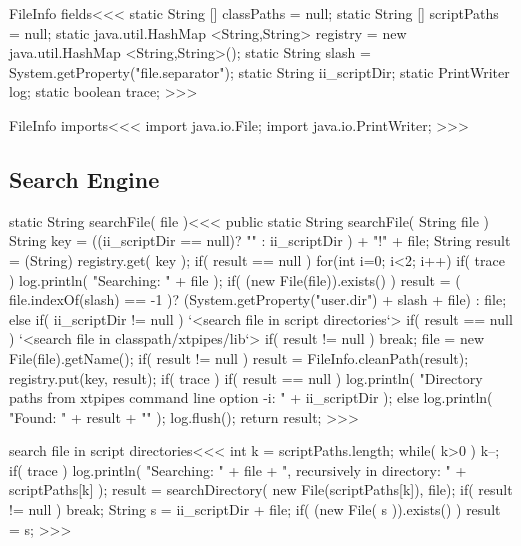 \documentclass{article}
\begin{document}
\<FileInfo fields\><<<
static String [] classPaths = null;
static String [] scriptPaths = null;
static java.util.HashMap <String,String> registry =
                                  new java.util.HashMap <String,String>();
static String slash = System.getProperty("file.separator");
static String ii_scriptDir;
static PrintWriter log;
static boolean trace;
>>>


\<FileInfo imports\><<<
import java.io.File;
import java.io.PrintWriter;
>>>

\subsection{Search Engine}




\<static String searchFile( file )\><<<
public static String searchFile( String file ){
   String key = ((ii_scriptDir == null)? "" : ii_scriptDir )
                + "!" + file;
   String result = (String) registry.get( key );
   if( result == null ){
      for(int i=0; i<2; i++){
         if( trace ){
            log.println( "Searching: " + file );
         }
         if( (new File(file)).exists() ){
            result = ( file.indexOf(slash) == -1 )?
                         (System.getProperty("user.dir") + slash + file)
                        :
                         file;
         }
         else {
            if( ii_scriptDir != null ){
               `<search file in script directories`>
            }
            if( result == null ){
               `<search file in classpath/xtpipes/lib`>
         }  }
         if( result != null ){ break; }
         file =  new File(file).getName();
      }
      if( result != null ){
        result = FileInfo.cleanPath(result);
        registry.put(key, result);
      }
   }
   if( trace ){
      if( result == null ){
         log.println(
            "Directory paths from xtpipes command line option -i: "
                                            + ii_scriptDir );
      } else { log.println( "Found: " + result + "\n" ); }
      log.flush();
   }
   return result;
}
>>>



\<search file in script directories\><<<
int k = scriptPaths.length;
while( k>0 ){
  k--;
  if( trace ){
    log.println( "Searching: " + file
                   + ", recursively in directory: " + scriptPaths[k] );
  }
  result = searchDirectory( new File(scriptPaths[k]), file);
  if( result != null ){ break; }
}
String s = ii_scriptDir + file;
if( (new File( s )).exists() ){ result = s; }
>>>
\end{document}
